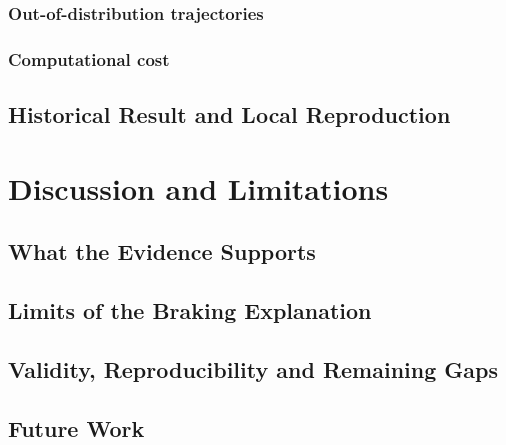 \documentclass[conference]{IEEEtran}
\begin{document}
\subsubsection{Out-of-distribution trajectories}
\subsubsection{Computational cost}
\subsection{Historical Result and Local Reproduction}

\section{Discussion and Limitations}
\subsection{What the Evidence Supports}
\subsection{Limits of the Braking Explanation}
\subsection{Validity, Reproducibility and Remaining Gaps}
\subsection{Future Work}
\end{document}
